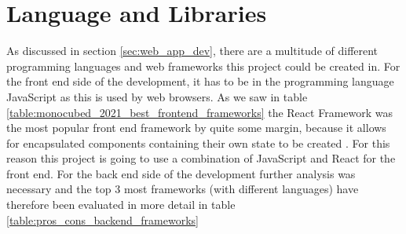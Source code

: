 \documentclass{UoYCSproject}
\begin{document}
\section{Language and Libraries}
As discussed in section \ref{sec:web_app_dev}, there are a multitude of different programming languages and web frameworks this project could be created in. For the front end side of the development, it has to be in the programming language JavaScript as this is used by web browsers. As we saw in table \ref{table:monocubed_2021_best_frontend_frameworks} the React Framework was the most popular front end framework by quite some margin, because it allows for encapsulated components containing their own state to be created \cite{react_docs}. For this reason this project is going to use a combination of JavaScript and React for the front end. For the back end side of the development further analysis was necessary and the top 3 most frameworks (with different languages) have therefore been evaluated in more detail in table \ref{table:pros_cons_backend_frameworks}


\begin{table}[H]
\begin{center}
\caption{Pros and Cons of different programming languages and backend frameworks}
\label{table:pros_cons_backend_frameworks}
\end{center}
\end{table}
\end{document}
